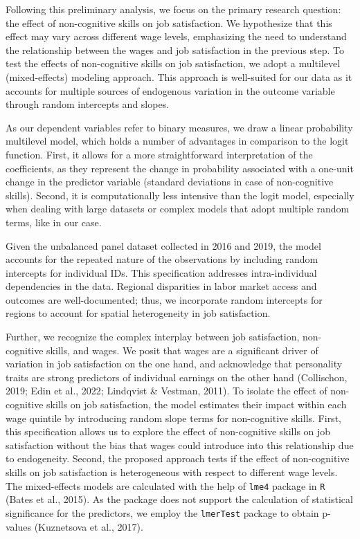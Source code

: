 \documentclass[
]{interact}
\begin{document}
Following this preliminary analysis, we focus on the primary research
question: the effect of non-cognitive skills on job satisfaction. We
hypothesize that this effect may vary across different wage levels,
emphasizing the need to understand the relationship between the wages
and job satisfaction in the previous step. To test the effects of
non-cognitive skills on job satisfaction, we adopt a multilevel
(mixed-effects) modeling approach. This approach is well-suited for our
data as it accounts for multiple sources of endogenous variation in the
outcome variable through random intercepts and slopes.

As our dependent variables refer to binary measures, we draw a linear
probability multilevel model, which holds a number of advantages in
comparison to the logit function. First, it allows for a more
straightforward interpretation of the coefficients, as they represent
the change in probability associated with a one-unit change in the
predictor variable (standard deviations in case of non-cognitive
skills). Second, it is computationally less intensive than the logit
model, especially when dealing with large datasets or complex models
that adopt multiple random terms, like in our case.

Given the unbalanced panel dataset collected in 2016 and 2019, the model
accounts for the repeated nature of the observations by including random
intercepts for individual IDs. This specification addresses
intra-individual dependencies in the data. Regional disparities in labor
market access and outcomes are well-documented; thus, we incorporate
random intercepts for regions to account for spatial heterogeneity in
job satisfaction.

Further, we recognize the complex interplay between job satisfaction,
non-cognitive skills, and wages. We posit that wages are a significant
driver of variation in job satisfaction on the one hand, and acknowledge
that personality traits are strong predictors of individual earnings on
the other hand (Collischon, 2019; Edin et al., 2022; Lindqvist \&
Vestman, 2011). To isolate the effect of non-cognitive skills on job
satisfaction, the model estimates their impact within each wage quintile
by introducing random slope terms for non-cognitive skills. First, this
specification allows us to explore the effect of non-cognitive skills on
job satisfaction without the bias that wages could introduce into this
relationship due to endogeneity. Second, the proposed approach tests if
the effect of non-cognitive skills on job satisfaction is heterogeneous
with respect to different wage levels. The mixed-effects models are
calculated with the help of \texttt{lme4} package in \texttt{R} (Bates
et al., 2015). As the package does not support the calculation of
statistical significance for the predictors, we employ the
\texttt{lmerTest} package to obtain p-values (Kuznetsova et al., 2017).
\end{document}
